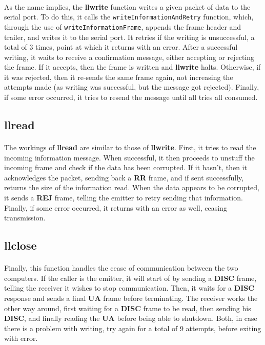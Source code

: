 \documentclass[11pt]{article}
\begin{document}
\paragraph{}As the name implies, the \textbf{llwrite} function writes a given packet of data to the serial
port. To do this, it calls the \verb|writeInformationAndRetry| function, which, through the use of
\verb|writeInformationFrame|, appends the frame header and trailer, and writes it to the serial port. It
retries if the writing is unsuccessful, a total of 3 times, point at which it returns with an error.
After a successful writing, it waits to receive a confirmation message, either accepting or rejecting the
frame. If it accepts, then the frame is written and \textbf{llwrite} halts. Otherwise, if it was rejected, then it
re-sends the same frame again, not increasing the attempts made (as writing was successful, but the message
got rejected). Finally, if some error occurred, it tries to resend the message until all tries all consumed.

\subsection*{llread}

\paragraph{}The workings of \textbf{llread} are similar to those of \textbf{llwrite}. First, it tries to read the incoming information message. When successful, it then proceeds to unstuff the incoming frame and
check if the data has been corrupted. If it hasn't, then it acknowledges the packet, sending back a
\textbf{RR} frame, and if sent successfully, returns the size of the information read. When the data appears
to be corrupted, it sends a \textbf{REJ} frame, telling the emitter to retry sending that information.
Finally, if some error occurred, it returns with an error as well, ceasing transmission.

\subsection*{llclose}

\paragraph{}Finally, this function handles the cease of communication between the two computers. If the
caller is the emitter, it will start of by sending a \textbf{DISC} frame, telling the receiver it wishes to
stop communication. Then, it waits for a \textbf{DISC} response and sends a final \textbf{UA} frame before
terminating. The receiver works the other way around, first waiting for a \textbf{DISC} frame to be read,
then sending his \textbf{DISC}, and finally reading the \textbf{UA} before being able to shutdown. Both, in
case there is a problem with writing, try again for a total of 9 attempts, before exiting with error.
\end{document}
